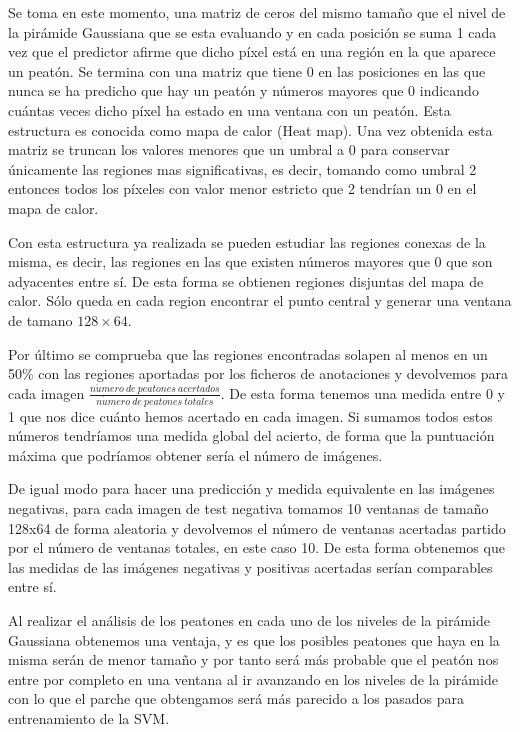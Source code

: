 \documentclass[a4paper,12pt]{article}
\begin{document}
Se toma en este momento, una matriz de ceros del mismo tamaño que el nivel de la pirámide Gaussiana que se esta evaluando y en cada posición se suma 1 cada vez que el predictor afirme que dicho píxel está en una región en la que aparece un peatón. Se termina con una matriz que tiene 0 en las posiciones en las que nunca se ha predicho que hay un peatón y números mayores que 0 indicando cuántas veces dicho píxel ha estado en una ventana con un peatón. Esta estructura es conocida como mapa de calor (Heat map). Una vez obtenida esta matriz se truncan los valores menores que un umbral a 0 para conservar únicamente las regiones mas significativas, es decir, tomando como umbral 2 entonces todos los píxeles con valor menor estricto que 2 tendrían un 0 en el mapa de calor. 

Con esta estructura ya realizada se pueden estudiar las regiones conexas de la misma, es decir, las regiones en las que existen números mayores que 0 que son adyacentes entre sí. De esta forma se obtienen regiones disjuntas del mapa de calor. Sólo queda en cada region encontrar el punto central y generar una ventana de tamano $128 \times 64$.

Por último se comprueba que las regiones encontradas solapen al menos en un 50\% con las regiones aportadas por los ficheros de anotaciones y devolvemos para cada imagen $\frac{n\acute{u}mero \ de \ peatones \ acertados}{n\acute{u}mero \ de \ peatones \ totales}$. De esta forma tenemos una medida entre 0 y 1 que nos dice cuánto hemos acertado en cada imagen. Si sumamos todos estos números tendríamos una medida global del acierto, de forma que la puntuación máxima que podríamos obtener sería el número de imágenes. 

De igual modo para hacer una predicción y medida equivalente en las imágenes negativas, para cada imagen de test negativa tomamos 10 ventanas de tamaño 128x64 de forma aleatoria y devolvemos el número de ventanas acertadas partido por el número de ventanas totales, en este caso 10. De esta forma obtenemos que las medidas de las imágenes negativas y positivas acertadas serían comparables entre sí. 

Al realizar el análisis de los peatones en cada uno de los niveles de la pirámide Gaussiana obtenemos una ventaja, y es que los posibles peatones que haya en la misma serán de menor tamaño y por tanto será más probable que el peatón nos entre por completo en una ventana al ir avanzando en los niveles de la pirámide con lo que el parche que obtengamos será más parecido a los pasados para entrenamiento de la SVM.
\end{document}
